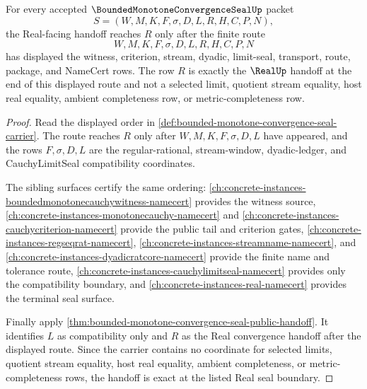 \begin{theorem}
\label{thm:bounded-monotone-convergence-seal-real-handoff}
For every accepted $\BoundedMonotoneConvergenceSealUp$ packet
$$
S=(W,M,K,F,\sigma,D,L,R,H,C,P,N),
$$
the Real-facing handoff reaches $R$ only after the finite route
$$
W,M,K,F,\sigma,D,L,R,H,C,P,N
$$
has displayed the witness, criterion, stream, dyadic, limit-seal, transport, route, package, and NameCert rows. The row $R$ is exactly the $\RealUp$ handoff at the end of this displayed route and not a selected limit, quotient stream equality, host real equality, ambient completeness row, or metric-completeness row.
\end{theorem}
\begin{proof}
Read the displayed order in \autoref{def:bounded-monotone-convergence-seal-carrier}. The route reaches $R$ only after $W,M,K,F,\sigma,D,L$ have appeared, and the rows $F,\sigma,D,L$ are the regular-rational, stream-window, dyadic-ledger, and CauchyLimitSeal compatibility coordinates.

The sibling surfaces certify the same ordering: \autoref{ch:concrete-instances-boundedmonotonecauchywitness-namecert} provides the witness source, \autoref{ch:concrete-instances-monotonecauchy-namecert} and \autoref{ch:concrete-instances-cauchycriterion-namecert} provide the public tail and criterion gates, \autoref{ch:concrete-instances-regseqrat-namecert}, \autoref{ch:concrete-instances-streamname-namecert}, and \autoref{ch:concrete-instances-dyadicratcore-namecert} provide the finite name and tolerance route, \autoref{ch:concrete-instances-cauchylimitseal-namecert} provides only the compatibility boundary, and \autoref{ch:concrete-instances-real-namecert} provides the terminal seal surface.

Finally apply \autoref{thm:bounded-monotone-convergence-seal-public-handoff}. It identifies $L$ as compatibility only and $R$ as the Real convergence handoff after the displayed route. Since the carrier contains no coordinate for selected limits, quotient stream equality, host real equality, ambient completeness, or metric-completeness rows, the handoff is exact at the listed Real seal boundary.
\end{proof}

